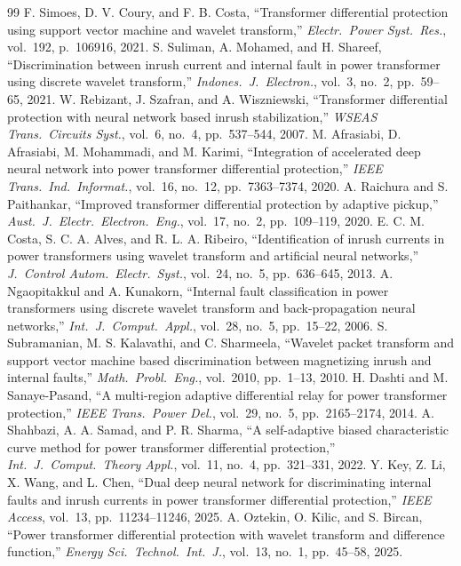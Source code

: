 \documentclass[12pt,a4paper,oneside]{report}
\begin{document}
\begin{thebibliography}{99}
 F. Simoes, D. V. Coury, and F. B. Costa, ``Transformer differential protection using support vector machine and wavelet transform,'' \textit{Electr.\ Power Syst.\ Res.}, vol.~192, p.~106916, 2021.
 S. Suliman, A. Mohamed, and H. Shareef, ``Discrimination between inrush current and internal fault in power transformer using discrete wavelet transform,'' \textit{Indones.\ J.\ Electron.}, vol.~3, no.~2, pp.~59--65, 2021.
 W. Rebizant, J. Szafran, and A. Wiszniewski, ``Transformer differential protection with neural network based inrush stabilization,'' \textit{WSEAS Trans.\ Circuits Syst.}, vol.~6, no.~4, pp.~537--544, 2007.
 M. Afrasiabi, D. Afrasiabi, M. Mohammadi, and M. Karimi, ``Integration of accelerated deep neural network into power transformer differential protection,'' \textit{IEEE Trans.\ Ind.\ Informat.}, vol.~16, no.~12, pp.~7363--7374, 2020.
 A. Raichura and S. Paithankar, ``Improved transformer differential protection by adaptive pickup,'' \textit{Aust.\ J.\ Electr.\ Electron.\ Eng.}, vol.~17, no.~2, pp.~109--119, 2020.
 E. C. M. Costa, S. C. A. Alves, and R. L. A. Ribeiro, ``Identification of inrush currents in power transformers using wavelet transform and artificial neural networks,'' \textit{J.\ Control Autom.\ Electr.\ Syst.}, vol.~24, no.~5, pp.~636--645, 2013.
 A. Ngaopitakkul and A. Kunakorn, ``Internal fault classification in power transformers using discrete wavelet transform and back-propagation neural networks,'' \textit{Int.\ J.\ Comput.\ Appl.}, vol.~28, no.~5, pp.~15--22, 2006.
 S. Subramanian, M. S. Kalavathi, and C. Sharmeela, ``Wavelet packet transform and support vector machine based discrimination between magnetizing inrush and internal faults,'' \textit{Math.\ Probl.\ Eng.}, vol.~2010, pp.~1--13, 2010.
 H. Dashti and M. Sanaye-Pasand, ``A multi-region adaptive differential relay for power transformer protection,'' \textit{IEEE Trans.\ Power Del.}, vol.~29, no.~5, pp.~2165--2174, 2014.
 A. Shahbazi, A. A. Samad, and P. R. Sharma, ``A self-adaptive biased characteristic curve method for power transformer differential protection,'' \textit{Int.\ J.\ Comput.\ Theory Appl.}, vol.~11, no.~4, pp.~321--331, 2022.
 Y. Key, Z. Li, X. Wang, and L. Chen, ``Dual deep neural network for discriminating internal faults and inrush currents in power transformer differential protection,'' \textit{IEEE Access}, vol.~13, pp.~11234--11246, 2025.
 A. Oztekin, O. Kilic, and S. Bircan, ``Power transformer differential protection with wavelet transform and difference function,'' \textit{Energy Sci.\ Technol.\ Int.\ J.}, vol.~13, no.~1, pp.~45--58, 2025.

\end{thebibliography}
\end{document}

